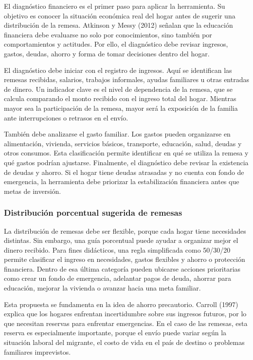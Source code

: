 \documentclass[12pt,letterpaper]{article}
\begin{document}
El diagnóstico financiero es el primer paso para aplicar la herramienta. Su objetivo es conocer la situación económica real del hogar antes de sugerir una distribución de la remesa. Atkinson y Messy (2012) señalan que la educación financiera debe evaluarse no solo por conocimientos, sino también por comportamientos y actitudes. Por ello, el diagnóstico debe revisar ingresos, gastos, deudas, ahorro y forma de tomar decisiones dentro del hogar.

El diagnóstico debe iniciar con el registro de ingresos. Aquí se identifican las remesas recibidas, salarios, trabajos informales, ayudas familiares u otras entradas de dinero. Un indicador clave es el nivel de dependencia de la remesa, que se calcula comparando el monto recibido con el ingreso total del hogar. Mientras mayor sea la participación de la remesa, mayor será la exposición de la familia ante interrupciones o retrasos en el envío.

También debe analizarse el gasto familiar. Los gastos pueden organizarse en alimentación, vivienda, servicios básicos, transporte, educación, salud, deudas y otros consumos. Esta clasificación permite identificar en qué se utiliza la remesa y qué gastos podrían ajustarse. Finalmente, el diagnóstico debe revisar la existencia de deudas y ahorro. Si el hogar tiene deudas atrasadas y no cuenta con fondo de emergencia, la herramienta debe priorizar la estabilización financiera antes que metas de inversión.

\subsubsection{\texorpdfstring{\textbf{Distribución porcentual sugerida de remesas}}{Distribución porcentual sugerida de remesas}}\label{distribuciuxf3n-porcentual-sugerida-de-remesas}

La distribución de remesas debe ser flexible, porque cada hogar tiene necesidades distintas. Sin embargo, una guía porcentual puede ayudar a organizar mejor el dinero recibido. Para fines didácticos, una regla simplificada como 50/30/20 permite clasificar el ingreso en necesidades, gastos flexibles y ahorro o protección financiera. Dentro de esa última categoría pueden ubicarse acciones prioritarias como crear un fondo de emergencia, adelantar pagos de deuda, ahorrar para educación, mejorar la vivienda o avanzar hacia una meta familiar.

Esta propuesta se fundamenta en la idea de ahorro precautorio. Carroll (1997) explica que los hogares enfrentan incertidumbre sobre sus ingresos futuros, por lo que necesitan reservas para enfrentar emergencias. En el caso de las remesas, esta reserva es especialmente importante, porque el envío puede variar según la situación laboral del migrante, el costo de vida en el país de destino o problemas familiares imprevistos.
\end{document}
